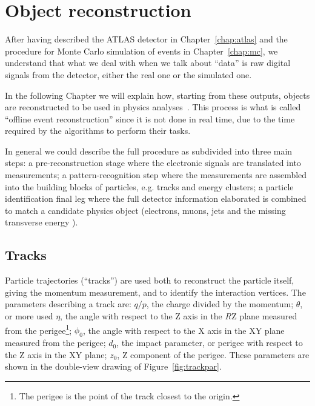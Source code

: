 \clearpage{\pagestyle{empty}\cleardoublepage}

\chapter{Object reconstruction}\label{chap:objects}

After having described the ATLAS detector in Chapter~\ref{chap:atlas} 
and the procedure for Monte Carlo simulation of events in Chapter~\ref{chap:mc},
we understand that what we deal with when we talk about ``data'' 
is raw digital signals from the detector,
either the real one or the simulated one.

In the following Chapter we will explain how, starting from these outputs,
objects are reconstructed to be used in physics analyses~\cite{Aad:2009wy}. 
This process is what is called ``offline event reconstruction'' since
it is not done in real time, due to the time required by the algorithms
to perform their tasks.

In general we could describe the full procedure as subdivided into
three main steps: a pre-reconstruction stage where the electronic signals are
translated into measurements; a pattern-recognition step where the measurements
are assembled into the building blocks of particles, e.g. tracks and energy clusters;
a particle identification final leg where the full detector information elaborated 
is combined to match a candidate physics object 
(electrons, muons, jets and the missing transverse energy \met).


\section{Tracks}\label{sec:tracks}

Particle trajectories (``tracks'') are used both to reconstruct the particle itself, giving the 
momentum measurement, and to identify the interaction vertices.
The parameters describing a track are: $q/p$, the charge divided by the momentum; $\theta$, or more used $\eta$, the angle
with respect to the Z axis in the $R$Z plane measured from the 
perigee\footnote{The perigee is the point of the track closest to the origin.}; $\phi_0$, the angle 
with respect to the X axis in the XY plane measured from the perigee; $d_0$, the impact parameter, 
or perigee with respect to the Z axis in the XY plane; $z_0$, Z component of the perigee.
These parameters are shown in the double-view drawing of Figure~\ref{fig:trackpar}.

